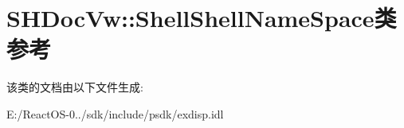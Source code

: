\hypertarget{class_s_h_doc_vw_1_1_shell_shell_name_space}{}\section{S\+H\+Doc\+Vw\+:\+:Shell\+Shell\+Name\+Space类 参考}
\label{class_s_h_doc_vw_1_1_shell_shell_name_space}


该类的文档由以下文件生成\+:\begin{DoxyCompactItemize}
\item 
E\+:/\+React\+O\+S-\/0../sdk/include/psdk/exdisp.\+idl\end{DoxyCompactItemize}
